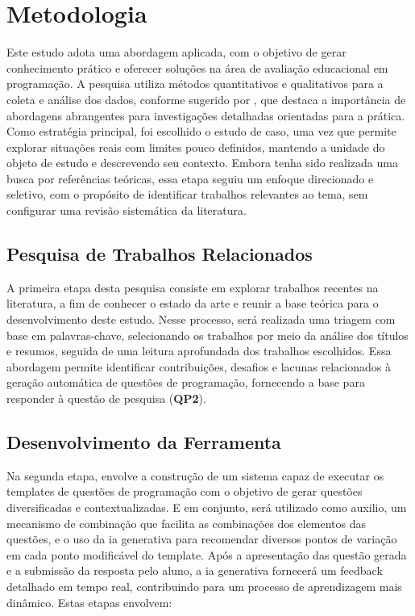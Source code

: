 \chapter{Metodologia}\label{cap:metodologia}

Este estudo adota uma abordagem aplicada, com o objetivo de gerar conhecimento prático e oferecer soluções na área de avaliação educacional em programação. A pesquisa utiliza métodos quantitativos e qualitativos para a coleta e análise dos dados, conforme sugerido por \parencite{Gil2017}, que destaca a importância de abordagens abrangentes para investigações detalhadas orientadas para a prática. Como estratégia principal, foi escolhido o estudo de caso, uma vez que permite explorar situações reais com limites pouco definidos, mantendo a unidade do objeto de estudo e descrevendo seu contexto. Embora tenha sido realizada uma busca por referências teóricas, essa etapa seguiu um enfoque direcionado e seletivo, com o propósito de identificar trabalhos relevantes ao tema, sem configurar uma revisão sistemática da literatura. 

\section{Pesquisa de Trabalhos Relacionados}

A primeira etapa desta pesquisa consiste em explorar trabalhos recentes na literatura, a fim de conhecer o estado da arte e reunir a base teórica para o desenvolvimento deste estudo. Nesse processo, será realizada uma triagem com base em palavras-chave, selecionando os trabalhos por meio da análise dos títulos e resumos, seguida de uma leitura aprofundada dos trabalhos escolhidos. Essa abordagem permite identificar contribuições, desafios e lacunas relacionados à geração automática de questões de programação, fornecendo a base para responder à questão de pesquisa (\textbf{QP2}). 


\section{Desenvolvimento da Ferramenta}
Na segunda etapa, envolve a construção de um sistema capaz de executar os templates de questões de programação com o objetivo de gerar questões diversificadas e contextualizadas. E em conjunto, será utilizado como auxilio, um mecanismo de combinação que facilita as combinações dos elementos das questões, e o uso da \gls{ia} generativa para recomendar diversos pontos de variação em cada ponto modificável do template. Após a apresentação das questão gerada e a submissão da resposta pelo aluno, a \gls{ia}  generativa fornecerá um feedback detalhado em tempo real, contribuindo para um processo de aprendizagem mais dinâmico. Estas etapas envolvem: 

